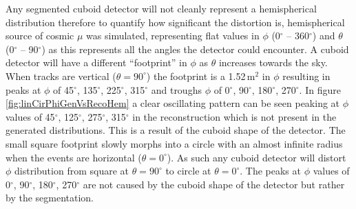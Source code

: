 Any segmented cuboid detector will not cleanly represent a hemispherical distribution therefore to quantify how significant the distortion is, hemispherical source of cosmic $\mu$ was simulated, representing flat values in $\phi$ (0$^\circ$ -- 360$^\circ$) and $\theta$ (0$^\circ$ -- 90$^\circ$) as this represents all the angles the detector could encounter. A cuboid detector will have a different ``footprint'' in $\phi$ as $\theta$ increases towards the sky. When tracks are vertical ($\theta = 90^\circ$) the footprint is a 1.52\,m$^2$ in $\phi$ resulting in peaks at $\phi$ of 45$^\circ$, 135$^\circ$, 225$^\circ$, 315$^\circ$ and troughs $\phi$ of 0$^\circ$, 90$^\circ$, 180$^\circ$, 270$^\circ$. In figure \ref{fig:linCirPhiGenVsRecoHem} a clear oscillating pattern can be seen peaking at $\phi$ values of 45$^\circ$, 125$^\circ$, 275$^\circ$, 315$^\circ$ in the reconstruction which is not present in the generated distributions. This is a result of the cuboid shape of the detector. The small square footprint slowly morphs into a circle with an almost infinite radius when the events are horizontal ($\theta = 0^\circ$). As such any cuboid detector will distort $\phi$ distribution from square at $\theta = 90^\circ$ to circle at $\theta = 0^\circ$. The peaks at $\phi$ values of 0$^\circ$, 90$^\circ$, 180$^\circ$, 270$^\circ$ are not caused by the cuboid shape of the detector but rather by the segmentation. 
